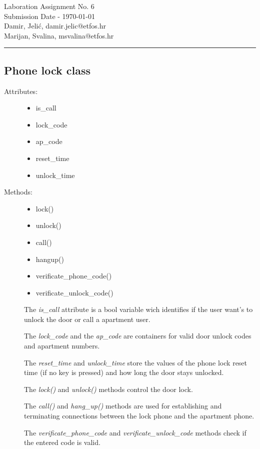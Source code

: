\documentclass[11pt,a4paper]{article}
\begin{document}
\large
Laboration Assignment No. 6 \\
Submission Date - \yyyymmdddate \today \\
Damir, Jelić, damir.jelic@etfos.hr \\
Marijan, Svalina, msvalina@etfos.hr
\\
\rule{\linewidth}{0.1mm}

\setcounter{section}{6}
\subsection{Phone lock class}
\begin{description}
    \item[Attributes:] \hfill
    \begin{itemize}
        \item is\_call
        \item lock\_code
        \item ap\_code
        \item reset\_time
        \item unlock\_time
    \end{itemize}
    \item[Methods:] \hfill
    \begin{itemize}
        \item lock()
        \item unlock()
        \item call()
        \item hangup()
        \item verificate\_phone\_code()
        \item verificate\_unlock\_code()
    \end{itemize}
\end{description}
\begin{description}
    \item[]
    The \emph{is\_call} attribute is a bool variable wich identifies if the user
    want's to unlock the door or call a apartment user.
    \item[]
    The \emph{lock\_code} and the \emph{ap\_code} are containers for valid 
    door unlock codes and apartment numbers.
    \item[]
    The \emph{reset\_time} and \emph{unlock\_time} store the values of the
    phone lock reset time (if no key is pressed) and how long the door stays
    unlocked.
    \item[]
    The \emph{lock()} and \emph{unlock()} methods control the door lock.
    \item[] 
    The \emph{call()} and \emph{hang\_up()} methods are used for establishing
    and terminating connections between the lock phone and the apartment phone.
    \item[]
    The \emph{verificate\_phone\_code} and \emph{verificate\_unlock\_code}
    methods check if the entered code is valid.

\end{description}
\end{document}
